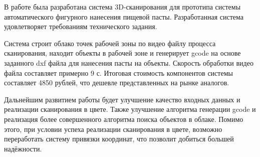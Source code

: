 \conclusion
В работе была разработана система 3D-сканирования для прототипа системы автоматического фигурного нанесения пищевой пасты. Разработанная система удовлетворяет требованиям технического задания.

Система строит облако точек рабочей зоны по видео файлу процесса сканирования, находит объекты в рабочей зоне и генерирует gcode на основе заданного dxf файла для нанесения пасты на объекты. Скорость обработки видео файла составляет примерно 9 с. Итоговая стоимость компонентов системы составляет 4850 рублей, что дешевле представленных на рынке аналогов.

Дальнейшим развитием работы будет улучшение качество входных данных и реализации сканирования в цвете. Также улучшение алгоритма генерации gcode и реализация более совершенного алгоритма поиска объектов в облаке. Помимо этого, при условии успеха реализации сканирования в цвете, возможно переработать систему привязки координат, что позволит добиться большей надёжности.